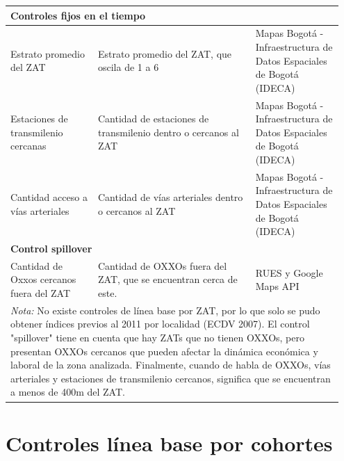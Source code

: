 \documentclass{article}
\begin{document}
\begin{longtable}{p{0.25\linewidth} p{0.45\linewidth} p{0.25\linewidth}}
\midrule
\multicolumn{3}{l}{\textbf{Controles fijos en el tiempo}} \\
\midrule
Estrato promedio del ZAT & Estrato promedio del ZAT, que oscila de 1 a 6 & Mapas Bogotá - Infraestructura de Datos Espaciales de Bogotá (IDECA) \\
\midrule
Estaciones de transmilenio cercanas & Cantidad de estaciones de transmilenio dentro o cercanos al ZAT & Mapas Bogotá - Infraestructura de Datos Espaciales de Bogotá (IDECA) \\
\midrule
Cantidad acceso a vías arteriales & Cantidad de vías arteriales dentro o cercanos al ZAT & Mapas Bogotá - Infraestructura de Datos Espaciales de Bogotá (IDECA) \\
\midrule
\multicolumn{3}{l}{\textbf{Control spillover}} \\
\midrule
Cantidad de Oxxos cercanos fuera del ZAT & Cantidad de OXXOs fuera del ZAT, que se encuentran cerca de este. & RUES y Google Maps API \\
\bottomrule
\multicolumn{3}{p{\linewidth}}{%
\vspace{0.5em}
\footnotesize{ \textit{Nota:} No existe controles de línea base por ZAT, por lo que solo se pudo obtener índices previos al 2011 por localidad (ECDV 2007). El control "spillover" tiene en cuenta que hay ZATs que no tienen OXXOs, pero presentan OXXOs cercanos que pueden afectar la dinámica económica y laboral de la zona analizada. Finalmente, cuando de habla de OXXOs, vías arteriales y estaciones de transmilenio cercanos, significa que se encuentran a menos de 400m del ZAT.}}
\end{longtable}

\section{Controles línea base por cohortes}
\label{sec:controles_linea_base}
\end{document}
